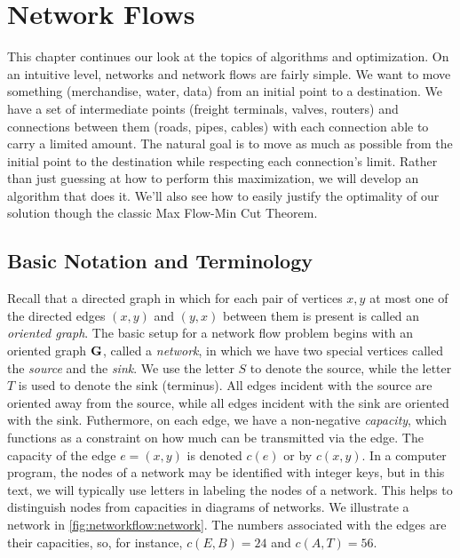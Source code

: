 
\chapter{Network Flows}\label{ch:networkflow}

This chapter continues our look at the topics of algorithms and
optimization. On an intuitive level, networks and network flows are
fairly simple. We want to move something (merchandise, water, data)
from an initial point to a destination. We have a set of intermediate
points (freight terminals, valves, routers) and connections between
them (roads, pipes, cables) with each connection able to carry a
limited amount. The natural goal is to move as much as possible from
the initial point to the destination while respecting each
connection's limit. Rather than just guessing at how to perform this
maximization, we will develop an algorithm that does it. We'll also
see how to easily justify the optimality of our solution though the
classic Max Flow-Min Cut Theorem.

\section{Basic Notation and Terminology}\label{s:networkflow:intro}

Recall that a directed graph in which for each pair of vertices $x,y$
at most one of the directed edges $(x,y)$ and $(y,x)$ between them is
present is called an \emph{oriented graph}. The basic setup for a
network flow problem begins with an oriented graph $\mathbf{G}$, called a
\textit{network}, in which we have two special vertices called the
\textit{source} and the \textit{sink}.  We use the letter $S$ to
denote the source, while the letter $T$ is used to denote the sink
(terminus).  All edges incident with the source are oriented away from
the source, while all edges incident with the sink are oriented with
the sink.  Futhermore, on each edge, we have a non-negative
\textit{capacity}, which functions as a constraint on how much can be
transmitted via the edge. The capacity of the edge $e=(x,y)$ is
denoted $c(e)$ or by $c(x,y)$.  In a computer program, the nodes of a
network may be identified with integer keys, but in this text, we will
typically use letters in labeling the nodes of a network.  This helps
to distinguish nodes from capacities in diagrams of networks.  We
illustrate a network in \autoref{fig:networkflow:network}. The numbers
associated with the edges are their capacities, so, for instance,
$c(E,B)=24$ and $c(A,T)=56$.

